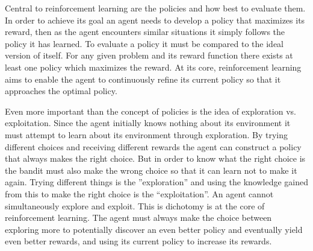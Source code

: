 Central to reinforcement learning are the policies and how best to evaluate them. In order to achieve its goal an agent needs to develop a policy that maximizes its reward, then as the agent encounters similar situations it simply follows the policy it has learned. To evaluate a policy it must be compared to the ideal version of itself. For any given problem and its reward function there exists at least one policy which maximizes the reward. At its core, reinforcement learning aims to enable the agent to continuously refine its current policy so that it approaches the optimal policy. 

Even more important than the concept of policies is the idea of exploration vs. exploitation. Since the agent initially knows nothing about its environment it must attempt  to learn about its environment through exploration. By trying different choices and receiving different rewards the agent can construct a policy that always makes the right choice. But in order to know what the right choice is the bandit must also make the wrong choice so that it can learn not to make it again. Trying different things is the ''exploration'' and using the knowledge gained from this to make the right choice is the ``exploitation''. An agent cannot simultaneously explore and exploit. This is dichotomy is at the core of reinforcement learning. The agent must always make the choice between exploring more to potentially discover an even better policy and eventually yield even better rewards, and using its current policy to increase its rewards. 

